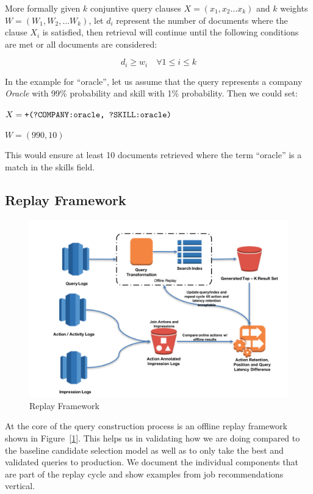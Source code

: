 More formally given $k$ conjuntive query clauses $X = (x_1, x_2 \ldots x_k)$ and
$k$ weights $W = (W_1, W_2, \ldots W_k)$, let $d_i$ represent the number of
documents where the clause $X_i$ is satisfied, then retrieval will continue
until the following conditions are met or all documents are considered:

\begin{equation} \label{eqn:flex}
    d_i \geq w_i \quad \forall 1 \leq i \leq k
\end{equation}

In the example for ``oracle'', let us assume that the query represents a
company {\it Oracle} with 99\% probability and skill with 1\% probability.
Then we could set:

$X = \lucenequery{+(?COMPANY:oracle, ?SKILL:oracle)}$

$W = (990, 10)$ 

This
would ensure at least 10 documents retrieved where the term ``oracle'' is a
match in the skills field.

\subsection{Replay Framework} \label{sec:replay-framework}

\begin{figure}
\centering
\includegraphics[scale=0.75]{replay-architecture.png}
\caption{Replay Framework}
\label{fig:replay-architecture}
\end{figure}

At the core of the query construction process is an offline replay framework
shown in Figure~[\ref{fig:replay-architecture}]. This helps us in validating how we 
are doing compared to the baseline candidate selection model as well as to only 
take the best and validated queries to production.
We document the individual components that are part of the replay cycle and show 
examples from job recommendations vertical.

